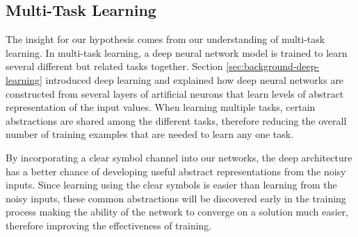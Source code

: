 \subsection{Multi-Task Learning} \label{sec:theory-hypothesis-multi-task-learning}

The insight for our hypothesis comes from our understanding of multi-task learning. In multi-task learning, a deep neural network model is trained to learn several different but related tasks together\cite{silver2007context}. Section \ref{sec:background-deep-learning} introduced deep learning and explained how deep neural networks are constructed from several layers of artificial neurons that learn levels of abstract representation of the input values. When learning multiple tasks, certain abstractions are shared among the different tasks, therefore reducing the overall number of training examples that are needed to learn any one task.

By incorporating a clear symbol channel into our networks, the deep architecture has a better chance of developing useful abstract representations from the noisy inputs\cite{Bengio:2009:LDA:1658423.1658424}. Since learning using the clear symbols is easier than learning from the noisy inputs, these common abstractions will be discovered early in the training process making the ability of the network to converge on a solution much easier, therefore improving the effectiveness of training.